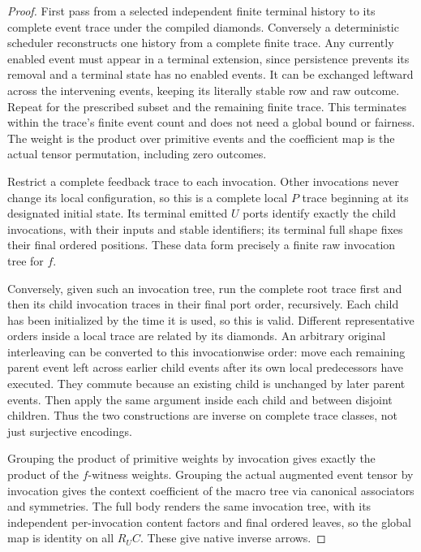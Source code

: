 \documentclass[11pt]{article}
\begin{document}
\begin{proof}
First pass from a selected independent finite terminal history to its complete event trace under the compiled diamonds. Conversely a deterministic scheduler reconstructs one history from a complete finite trace. Any currently enabled event must appear in a terminal extension, since persistence prevents its removal and a terminal state has no enabled events. It can be exchanged leftward across the intervening events, keeping its literally stable row and raw outcome. Repeat for the prescribed subset and the remaining finite trace. This terminates within the trace's finite event count and does not need a global bound or fairness. The weight is the product over primitive events and the coefficient map is the actual tensor permutation, including zero outcomes.

Restrict a complete feedback trace to each invocation. Other invocations never change its local configuration, so this is a complete local $P$ trace beginning at its designated initial state. Its terminal emitted $U$ ports identify exactly the child invocations, with their inputs and stable identifiers; its terminal full shape fixes their final ordered positions. These data form precisely a finite raw invocation tree for $f$.

Conversely, given such an invocation tree, run the complete root trace first and then its child invocation traces in their final port order, recursively. Each child has been initialized by the time it is used, so this is valid. Different representative orders inside a local trace are related by its diamonds. An arbitrary original interleaving can be converted to this invocationwise order: move each remaining parent event left across earlier child events after its own local predecessors have executed. They commute because an existing child is unchanged by later parent events. Then apply the same argument inside each child and between disjoint children. Thus the two constructions are inverse on complete trace classes, not just surjective encodings.

Grouping the product of primitive weights by invocation gives exactly the product of the $f$-witness weights. Grouping the actual augmented event tensor by invocation gives the context coefficient of the macro tree via canonical associators and symmetries. The full body renders the same invocation tree, with its independent per-invocation content factors and final ordered leaves, so the global map is identity on all $R_UC$. These give native inverse arrows.


\end{proof}
\end{document}
